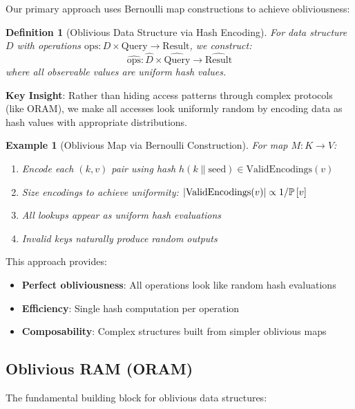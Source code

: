 \documentclass[11pt,final,hidelinks]{article}
\newtheorem{definition}[theorem]{Definition}
\newtheorem{example}[theorem]{Example}
\begin{document}
Our primary approach uses Bernoulli map constructions to achieve obliviousness:

\begin{definition}[Oblivious Data Structure via Hash Encoding]
For data structure $D$ with operations $\text{ops}: D \times \text{Query} \to \text{Result}$, we construct:
\begin{equation}
\widehat{\text{ops}}: \widehat{D} \times \widehat{\text{Query}} \to \widehat{\text{Result}}
\end{equation}
where all observable values are uniform hash values.
\end{definition}

\textbf{Key Insight}: Rather than hiding access patterns through complex protocols (like ORAM), we make all accesses look uniformly random by encoding data as hash values with appropriate distributions.

\begin{example}[Oblivious Map via Bernoulli Construction]
For map $M: K \to V$:
\begin{enumerate}
    \item Encode each $(k, v)$ pair using hash $h(k \| \text{seed}) \in \text{ValidEncodings}(v)$
    \item Size encodings to achieve uniformity: $|\text{ValidEncodings}(v)| \propto 1/\mathbb{P}\left[v\right]$
    \item All lookups appear as uniform hash evaluations
    \item Invalid keys naturally produce random outputs
\end{enumerate}
\end{example}

This approach provides:
\begin{itemize}
    \item \textbf{Perfect obliviousness}: All operations look like random hash evaluations
    \item \textbf{Efficiency}: Single hash computation per operation
    \item \textbf{Composability}: Complex structures built from simpler oblivious maps
\end{itemize}

\subsection{Oblivious RAM (ORAM)}

The fundamental building block for oblivious data structures:
\end{document}
